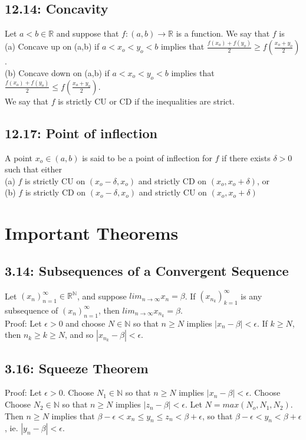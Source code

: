 \documentclass[10pt,letter]{report}
\begin{document}
\section*{12.14: Concavity}
Let $a<b\in\mathbb{R}$ and suppose that $f:(a,b)\rightarrow\mathbb{R}$ is a function. We say that $f$ is \\ 
(a) Concave up on (a,b) if $a<x_o<y_o<b$ implies that $\frac{f(x_o)+f(y_o)}{2}\geq f(\frac{x_o+y_o}{2})$. \\ 
(b) Concave down on (a,b) if $a<x_o<y_o<b$ implies that $\frac{f(x_o)+f(y_o)}{2}\leq f(\frac{x_o+y_o}{2})$. \\ 
We say that $f$ is strictly CU or CD if the inequalities are strict. 

\section*{12.17: Point of inflection}
A point $x_o\in(a,b)$ is said to be a point of inflection for $f$ if there exists $\delta>0$ such that either \\ 
(a) $f$ is strictly CU on $(x_o-\delta,x_o)$ and strictly CD on $(x_o,x_o+\delta)$, or \\ 
(b) $f$ is strictly CD on $(x_o-\delta,x_o)$ and strictly CU on $(x_o,x_o+\delta)$ 




\chapter*{Important Theorems}

\section*{3.14: Subsequences of a Convergent Sequence}
Let $(x_n)_{n=1}^\infty \in \mathbb{R}^\mathbb{N}$, and suppose $lim_{n\rightarrow\infty}x_n = \beta$. If $(x_{n_k})_{k=1}^\infty$ is any subsequence of $(x_n)_{n=1}^\infty$, then $lim_{n\rightarrow\infty}x_{n_k} = \beta$.\\ 
Proof: Let $\epsilon > 0$ and choose $N \in \mathbb{N}$ so that $n \geq N$ implies $|x_n-\beta|<\epsilon$. If $k\geq N$, then $n_k\geq k\geq N$, and so $|x_{n_k}-\beta| < \epsilon$. 

\section*{3.16: Squeeze Theorem}
Proof: Let $\epsilon > 0$. Choose $N_1 \in\mathbb{N}$ so that $n\geq N$ implies $|x_n-\beta| < \epsilon$. Choose Choose $N_2 \in\mathbb{N}$ so that $n\geq N$ implies $|z_n-\beta| < \epsilon$. Let $N=max(N_o,N_1,N_2)$. Then $n\geq N$ implies that $\beta - \epsilon < x_n \leq y_n \leq z_n < \beta + \epsilon$, so that $\beta - \epsilon < y_n < \beta + \epsilon$, ie. $|y_n - \beta| < \epsilon$. 
\end{document}
